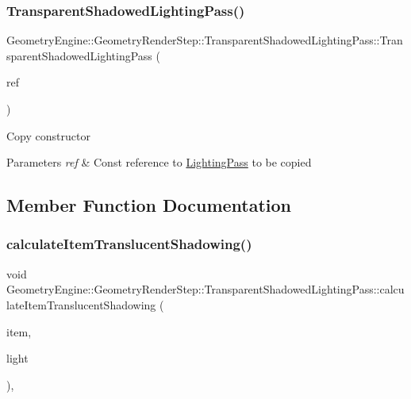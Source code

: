 \subsubsection{\texorpdfstring{TransparentShadowedLightingPass()}{TransparentShadowedLightingPass()}\hspace{0.1cm}{\footnotesize\ttfamily [2/2]}}
{\footnotesize\ttfamily Geometry\+Engine\+::\+Geometry\+Render\+Step\+::\+Transparent\+Shadowed\+Lighting\+Pass\+::\+Transparent\+Shadowed\+Lighting\+Pass (\begin{DoxyParamCaption}\item[{const \mbox{\hyperlink{class_geometry_engine_1_1_geometry_render_step_1_1_shadowed_lighting_pass}{Shadowed\+Lighting\+Pass}} \&}]{ref }\end{DoxyParamCaption})\hspace{0.3cm}{\ttfamily [inline]}}

Copy constructor 
\begin{DoxyParams}{Parameters}
{\em ref} & Const reference to \mbox{\hyperlink{class_geometry_engine_1_1_geometry_render_step_1_1_lighting_pass}{Lighting\+Pass}} to be copied \\
\hline
\end{DoxyParams}


\subsection{Member Function Documentation}
\mbox{\label{class_geometry_engine_1_1_geometry_render_step_1_1_transparent_shadowed_lighting_pass_acc1bb4b92b2c46deefca7db48645d6ef}} 
\subsubsection{\texorpdfstring{calculateItemTranslucentShadowing()}{calculateItemTranslucentShadowing()}}
{\footnotesize\ttfamily void Geometry\+Engine\+::\+Geometry\+Render\+Step\+::\+Transparent\+Shadowed\+Lighting\+Pass\+::calculate\+Item\+Translucent\+Shadowing (\begin{DoxyParamCaption}\item[{\mbox{\hyperlink{class_geometry_engine_1_1_geometry_world_item_1_1_geometry_item_1_1_geometry_item}{Geometry\+World\+Item\+::\+Geometry\+Item\+::\+Geometry\+Item}} $\ast$}]{item,  }\item[{\mbox{\hyperlink{class_geometry_engine_1_1_geometry_world_item_1_1_geometry_light_1_1_light}{Geometry\+World\+Item\+::\+Geometry\+Light\+::\+Light}} $\ast$}]{light }\end{DoxyParamCaption})\hspace{0.3cm}{\ttfamily [protected]}, {\ttfamily [virtual]}}

